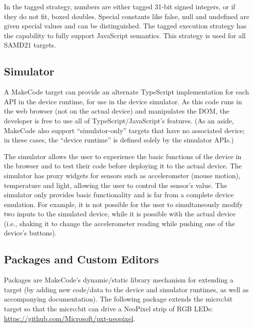 In the tagged strategy, numbers are either tagged 31-bit signed integers, or if they do not fit, 
boxed doubles. Special constants like false, null and undefined are given special values 
and can be distinguished. The tagged execution strategy has the capability to fully support
JavaScript semantics. This strategy is used for all SAMD21 targets.

\subsection{Simulator}

A MakeCode target can provide an alternate TypeScript implementation for each API in the device runtime, for use in the device
simulator. As this code runs in the web browser (not on the actual device) and manipulates the DOM, the developer is free to
use all of TypeScript/JavaScript's features. (As an aside, MakeCode also support ``simulator-only'' targets that have no 
associated device; in these cases, the ``device runtime'' is defined solely by the simulator APIs.) 

The simulator allows the user to experience the basic functions of the device in the browser and to test their code
before deploying it to the actual device. The simulator has proxy widgets for sensors such as accelerometer (mouse motion),
temperature and light, allowing the user to control the sensor's value.  The simulator only provides basic functionality
and is far from a complete device emulation.   For example, it is not possible for the user to simultaneously modify two
inputs to the simulated device, while it is possible with the actual device (i.e., shaking it to change the accelerometer
reading while pushing one of the device's buttons).


\subsection{Packages and Custom Editors}

Packages are MakeCode's dynamic/static library mechanism for extending a target (by adding new code/data to the device
and simulator runtimes, as well as accompanying documentation). The following package extends the micro:bit target so
that the micro:bit can drive a NeoPixel strip of RGB LEDs: \url{https://github.com/Microsoft/pxt-neopixel}. 

